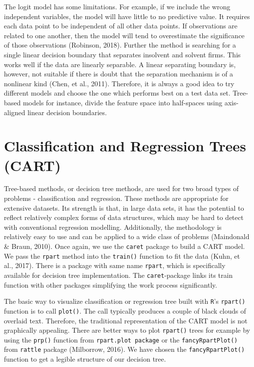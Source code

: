 \documentclass{article}
\begin{document}
The logit model has some limitations. For example, if we include the wrong independent variables, the model will have little to no predictive value. It requires each data point to be independent of all other data points. If observations are related to one another, then the model will tend to overestimate the significance of those observations (Robinson, 2018). Further the method is searching for a single linear decision boundary that separates insolvent and solvent firms. This works well if the data are linearly separable. A linear separating boundary is, however, not suitable if there is doubt that the separation mechanism is of a nonlinear kind (Chen, et al., 2011). Therefore, it is always a good idea to try different models and choose the one which performs best on a test data set. 
Tree-based models for instance, divide the feature space into half-spaces using axis-aligned linear decision boundaries.

\section{Classification and Regression Trees (CART)}

Tree-based methods, or decision tree methods, are used for two broad types of problems - classification and regression. These methods are appropriate for extensive datasets. Its strength is that, in large data sets, it has the potential to reflect relatively complex forms of data structures, which may be hard to detect with 
conventional regression modelling. Additionally, the methodology is relatively easy to use and can be applied to a wide class of problems (Maindonald \& Braun, 2010).
Once again, we use the \texttt{caret} package to build a CART model. We pass the \texttt{rpart} method into the \texttt{train()} function to fit the data (Kuhn, et al., 2017). There is a package with same name \texttt{rpart}, which is specifically available for decision tree implementation. The \texttt{caret}-package links its train function with other packages simplifying the work process significantly. 



The basic way to visualize classification or regression tree built with \texttt{R}'s \texttt{rpart()} function is to call \texttt{plot()}. The call typically produces a couple of black clouds of overlaid text. Therefore, the traditional representation of the CART model is not graphically appealing. There are better ways to plot \texttt{rpart()} trees for example by using the \texttt{prp()} function from \texttt{rpart.plot package} or the \texttt{fancyRpartPlot()} from \texttt{rattle} package (Milborrow, 2016). We have chosen the \texttt{fancyRpartPlot()} function to get a legible structure of our decision tree.
\end{document}
